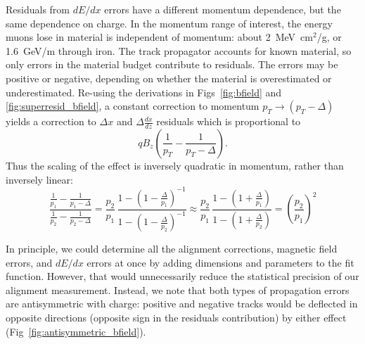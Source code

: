 \documentclass[12pt]{article}
\begin{document}
Residuals from $dE/dx$ errors have a different momentum dependence,
but the same dependence on charge.  In the momentum range of interest,
the energy muons lose in material is independent of momentum: about
2~MeV~cm$^2$/g, or 1.6~GeV/m through iron.  The track propagator
accounts for known material, so only errors in the material budget
contribute to residuals.  The errors may be positive or negative,
depending on whether the material is overestimated or underestimated.
Re-using the derivations in Figs~\ref{fig:bfield} and
\ref{fig:superresid_bfield}, a constant correction to momentum $p_T \to
(p_T - \Delta)$ yields a correction to $\Delta x$ and $\Delta
\frac{dx}{dz}$ residuals which is proportional to
\begin{equation}
q B_z \left(\frac{1}{p_T} - \frac{1}{p_T - \Delta}\right) \mbox{.}
\end{equation}
Thus the scaling of the effect is inversely quadratic in momentum,
rather than inversely linear:
\begin{equation}
\frac{\frac{1}{p_1} - \frac{1}{p_1 - \Delta}}{\frac{1}{p_2} - \frac{1}{p_2 - \Delta}}
= \frac{p_2}{p_1} \, \frac{1 - \left(1 - \frac{\Delta}{p_1}\right)^{-1}}{1 - \left(1 - \frac{\Delta}{p_2}\right)^{-1}}
\approx \frac{p_2}{p_1} \, \frac{1 - \left(1 + \frac{\Delta}{p_1}\right)}{1 - \left(1 + \frac{\Delta}{p_2}\right)}
= \left(\frac{p_2}{p_1}\right)^2
\end{equation}

In principle, we could determine all the alignment corrections,
magnetic field errors, and $dE/dx$ errors at once by adding dimensions
and parameters to the fit function.  However, that would unnecessarily
reduce the statistical precision of our alignment measurement.
Instead, we note that both types of propagation errors are
antisymmetric with charge: positive and negative tracks would be
deflected in opposite directions (opposite sign in the residuals
contribution) by either effect (Fig~\ref{fig:antisymmetric_bfield}).
\end{document}
